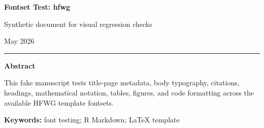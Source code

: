 \documentclass[12pt]{article}
\newif\ifhfwganon
\begin{document}
\begin{titlepage}
\thispagestyle{empty}
\vspace*{0.12\textheight}
\begin{center}
\begin{singlespace}

{\LARGE\bfseries Fontset Test: hfwg\par}

\vspace{0.35em}
{\large Synthetic document for visual regression checks\par}

\vspace{2.2em}

\hfwgauthorblock

\par\vspace{1.5\baselineskip}
\hfwgseriesblock

\ifhfwganon\else
\vspace{0.35em}
{\small May 2026}\par
\fi

\vspace{2.2\baselineskip}
\noindent\rule{0.35\textwidth}{0.4pt}\par
\vspace{0.65em}
\begin{minipage}{0.78\textwidth}
\small\singlespacing
\textbf{Abstract}\par\vspace{0.3em}
This fake manuscript tests title-page metadata, body typography,
citations, headings, mathematical notation, tables, figures, and code
formatting across the available HFWG template fontsets.
\par\vspace{0.6em}
\textbf{Keywords:} font testing; R Markdown; LaTeX template
\end{minipage}

\end{singlespace}
\end{center}
\vfill
\end{titlepage}
\else
\end{document}
